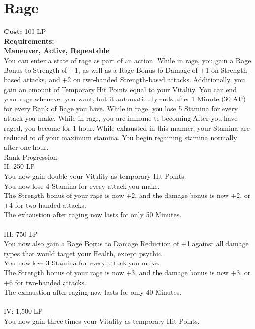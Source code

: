 \section{Rage}\label{perk:rage}
\textbf{Cost:} 100 LP\\
\textbf{Requirements:} -\\
\textbf{Maneuver, Active, Repeatable}\\
You can enter a state of rage as part of an action.
While in rage, you gain a Rage Bonus to Strength of +1, as well as a Rage Bonus to Damage of +1 on Strength-based attacks, and +2 on two-handed Strength-based attacks.
Additionally, you gain an amount of Temporary Hit Points equal to your Vitality.
You can end your rage whenever you want, but it automatically ends after 1 Minute (30 AP) for every Rank of Rage you have.
While in rage, you lose 5 Stamina for every attack you make.
While in rage, you are immune to becoming %
After you have raged, you become %
for 1 hour.
While exhausted in this manner, your Stamina are reduced to  of your maximum stamina.
You begin regaining stamina normally after one hour.
\\
Rank Progression:\\
II: 250 LP\\
You now gain double your Vitality as temporary Hit Points.\\
You now lose 4 Stamina for every attack you make.\\
The Strength bonus of your rage is now +2, and the damage bonus is now +2, or +4 for two-handed attacks.\\
The exhaustion after raging now lasts for only 50 Minutes.\\
\\
III: 750 LP\\
You now also gain a Rage Bonus to Damage Reduction of +1 against all damage types that would target your Health, except psychic.\\
You now lose 3 Stamina for every attack you make.\\
The Strength bonus of your rage is now +3, and the damage bonus is now +3, or +6 for two-handed attacks.\\
The exhaustion after raging now lasts for only 40 Minutes.\\
\\
IV: 1,500 LP\\
You now gain three times your Vitality as temporary Hit Points.\\
